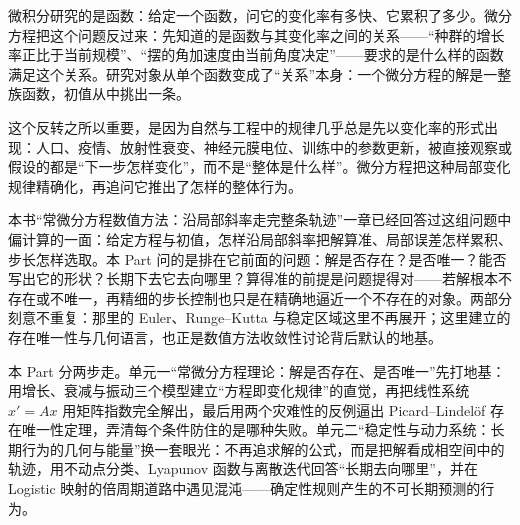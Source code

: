 微积分研究的是函数：给定一个函数，问它的变化率有多快、它累积了多少。微分方程把这个问题反过来：先知道的是函数与其变化率之间的关系——``种群的增长率正比于当前规模''、``摆的角加速度由当前角度决定''——要求的是什么样的函数满足这个关系。研究对象从单个函数变成了``关系''本身：一个微分方程的解是一整族函数，初值从中挑出一条。

这个反转之所以重要，是因为自然与工程中的规律几乎总是先以变化率的形式出现：人口、疫情、放射性衰变、神经元膜电位、训练中的参数更新，被直接观察或假设的都是``下一步怎样变化''，而不是``整体是什么样''。微分方程把这种局部变化规律精确化，再追问它推出了怎样的整体行为。

本书``常微分方程数值方法：沿局部斜率走完整条轨迹''一章已经回答过这组问题中偏计算的一面：给定方程与初值，怎样沿局部斜率把解算准、局部误差怎样累积、步长怎样选取。本 Part 问的是排在它前面的问题：解是否存在？是否唯一？能否写出它的形状？长期下去它去向哪里？算得准的前提是问题提得对——若解根本不存在或不唯一，再精细的步长控制也只是在精确地逼近一个不存在的对象。两部分刻意不重复：那里的 Euler、Runge--Kutta 与稳定区域这里不再展开；这里建立的存在唯一性与几何语言，也正是数值方法收敛性讨论背后默认的地基。

本 Part 分两步走。单元一``常微分方程理论：解是否存在、是否唯一''先打地基：用增长、衰减与振动三个模型建立``方程即变化规律''的直觉，再把线性系统 \(x'=Ax\) 用矩阵指数完全解出，最后用两个灾难性的反例逼出 Picard--Lindelöf 存在唯一性定理，弄清每个条件防住的是哪种失败。单元二``稳定性与动力系统：长期行为的几何与能量''换一套眼光：不再追求解的公式，而是把解看成相空间中的轨迹，用不动点分类、Lyapunov 函数与离散迭代回答``长期去向哪里''，并在 Logistic 映射的倍周期道路中遇见混沌——确定性规则产生的不可长期预测的行为。
